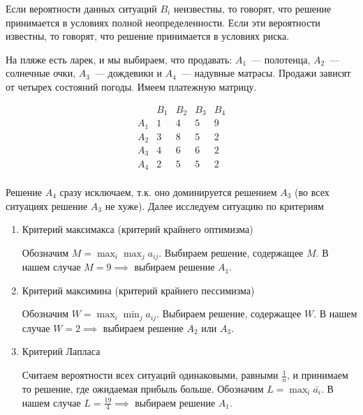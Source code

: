 Если вероятности данных ситуаций \(B_i\) неизвестны, то говорят, что решение
принимается в условиях полной неопределенности. Если эти вероятности известны,
то говорят, что решение принимается в условиях риска.


\begin{example}
  На пляже есть ларек, и мы выбираем, что продавать: \(A_1\)~--- полотенца,
  \(A_2\)~--- солнечные очки, \(A_3\)~--- дождевики и \(A_4\)~--- надувные
  матрасы. Продажи зависят от четырех состояний погоды. Имеем платежную матрицу.

  \begin{equation*}
    \begin{array}{c|cccc}
          & B_1 & B_2 & B_3 & B_4 \\ \hline
      A_1 & 1   & 4   & 5   & 9   \\
      A_2 & 3   & 8   & 5   & 2   \\
      A_3 & 4   & 6   & 6   & 2   \\
      A_4 & 2   & 5   & 5   & 2   \\
    \end{array}
  \end{equation*}

  Решение \(A_4\) сразу исключаем, т.к. оно доминируется решением \(A_3\) (во
  всех ситуациях решение \(A_3\) не хуже). Далее исследуем ситуацию по критериям

  \begin{enumerate}
  \item
    Критерий максимакса (критерий крайнего оптимизма)

    Обозначим \(M = \max_i \max_j a_{i j}\). Выбираем решение, содержащее \(M\).
    В нашем случае \(M = 9 \implies\) выбираем решение \(A_1\).

  \item
    Критерий максимина (критерий крайнего пессимизма)

    Обозначим \(W = \max_i \min_j a_{i j}\). Выбираем решение, содержащее \(W\).
    В нашем случае \(W = 2 \implies\) выбираем решение \(A_2\) или \(A_3\).
    
  \item
    Критерий Лапласа

    Считаем вероятности всех ситуаций одинаковыми, равными \(\frac{1}{n}\), и
    принимаем то решение, где ожидаемая прибыль больше. Обозначим \(L = \max_i
    \bar{a_i}\). В нашем случае \(L = \frac{19}{4} \implies\) выбираем решение
    \(A_1\).
  \end{enumerate}
\end{example}

